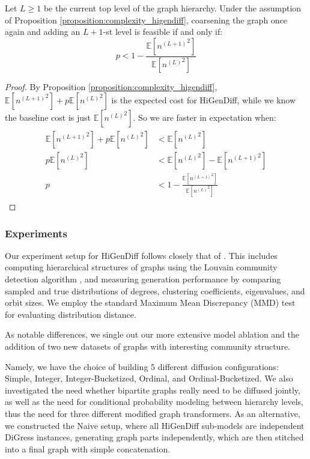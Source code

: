 \begin{proposition}
\label{proposition:feasibility_higendiff}
     Let $L \geq 1$ be the current top level of the graph hierarchy. Under the assumption of Proposition \ref{proposition:complexity_higendiff}, coarsening the graph once again and adding an $L+1$-st level is feasible if and only if:
     \begin{equation}
            p < 1 - \frac{\mathbb{E}[{n^{(L+1)}}^2]}{\mathbb{E}[{n^{(L)}}^2]}
     \end{equation}
\end{proposition}
\begin{proof}
    By Proposition \ref{proposition:complexity_higendiff}, $\mathbb{E}[{n^{(L+1)}}^2] + p \mathbb{E}[{n^{(L)}}^2]$ is the expected cost for HiGenDiff, while we know the baseline cost is just $\mathbb{E}[{n^{(L)}}^2]$. So we are faster in expectation when:
    \begin{align}
        \begin{split}
            \mathbb{E}[{n^{(L+1)}}^2] + p \mathbb{E}[{n^{(L)}}^2] &< \mathbb{E}[{n^{(L)}}^2] \\
            p \mathbb{E}[{n^{(L)}}^2] &< \mathbb{E}[{n^{(L)}}^2] - \mathbb{E}[{n^{(L+1)}}^2]  \\
            p &< 1 - \frac{\mathbb{E}[{n^{(L+1)}}^2]}{\mathbb{E}[{n^{(L)}}^2]}
        \end{split}
    \end{align}
\end{proof}

\subsubsection{Experiments}

Our experiment setup for HiGenDiff follows closely that of \cite{karami_multi-resolution_2024}. This includes computing hierarchical structures of graphs using the Louvain community detection algorithm \cite{blondel_fast_2008}, and measuring generation performance by comparing sampled and true distributions of degrees, clustering coefficients, eigenvalues, and orbit sizes. We employ the standard Maximum Mean Discrepancy (MMD) test \cite{gretton_kernel_2012} for evaluating distribution distance. 

As notable differences, we single out our more extensive model ablation and the addition of two new datasets of graphs with interesting community structure.

Namely, we have the choice of building 5 different diffusion configurations: Simple, Integer, Integer-Bucketized, Ordinal, and Ordinal-Bucketized. We also investigated the need whether bipartite graphs really need to be diffused jointly, as well as the need for conditional probability modeling between hierarchy levels, thus the need for three different modified graph transformers. As an alternative, we constructed the Naive setup, where all HiGenDiff sub-models are independent DiGress instances, generating graph parts independently, which are then stitched into a final graph with simple concatenation.

